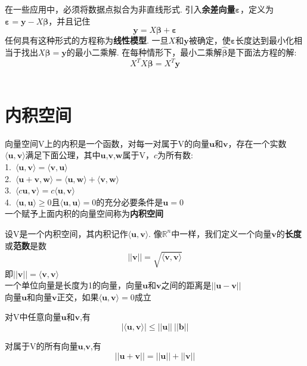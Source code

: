 在一些应用中，必须将数据点拟合为非直线形式. 引入\textbf{余差向量$\bm{\varepsilon}$}，定义为$\bm{\varepsilon}=\bm{y}-X\bm{\beta}$，并且记住
\[\bm{y}=X\bm{\beta}+\bm{\varepsilon}\]
任何具有这种形式的方程称为\textbf{线性模型}. 一旦$X$和$\bm{y}$被确定，使$\bm{\varepsilon}$长度达到最小化相当于找出$X\bm{\beta}=\bm{y}$的最小二乘解. 在每种情形下，最小二乘解$\hat{\bm{\beta}}$是下面法方程的解:
\[X^TX\bm{\beta}=X^T\bm{y}\]\\[2ex]

\section{内积空间}
\begin{definition}
向量空间V上的内积是一个函数，对每一对属于V的向量$\bm{u}$和$\bm{v}$，存在一个实数$\langle\bm{u},\bm{v}\rangle$满足下面公理，其中$\bm{u}$,$\bm{v}$,$\bm{w}$属于V，$c$为所有数:\\
1.\ $\langle\bm{u},\bm{v}\rangle=\langle\bm{v},\bm{u}\rangle$\\
2.\ $\langle\bm{u}+\bm{v},\bm{w}\rangle=\langle\bm{u},\bm{w}\rangle+\langle\bm{v},\bm{w}\rangle$\\
3.\ $\langle c\bm{u},\bm{v}\rangle=c\langle\bm{u},\bm{v}\rangle$\\
4.\ $\langle\bm{u},\bm{u}\rangle\geqslant 0\text{且}\langle\bm{u},\bm{u}\rangle=0\text{的充分必要条件是}\bm{u}=0$\\
一个赋予上面内积的向量空间称为\textbf{内积空间}
\end{definition}\vspace{4ex}

设V是一个内积空间，其内积记作$\langle\bm{u},\bm{v}\rangle$. 像$\mathbb{R}^n$中一样，我们定义一个向量$\bm{v}$的\textbf{长度}或\textbf{范数}是数
\[||\bm{v}||=\sqrt{\langle\bm{v},\bm{v}\rangle}\]
即$||\bm{v}||=\langle\bm{v},\bm{v}\rangle$\\[2ex]

一个单位向量是长度为1的向量，向量$\bm{u}$和$\bm{v}$之间的距离是$||\bm{u}-\bm{v}||$\\[1ex]

向量$\bm{u}$和向量$\bm{v}$正交，如果$\langle\bm{u},\bm{v}\rangle=0$成立\\[2ex]

\begin{TheoremTwo}[柯西-施瓦茨不等式]
对V中任意向量$\bm{u}$和$\bm{v}$,有
\[|\langle\bm{u},\bm{v}\rangle|\leqslant||\bm{u}||\ ||\bm{b}||\]
\end{TheoremTwo}\vspace{4ex}

\begin{TheoremTwo}[三角不等式]
对属于V的所有向量$\bm{u}$,$\bm{v}$,有
\[||\bm{u}+\bm{v}||=||\bm{u}||+||\bm{v}||\]
\end{TheoremTwo}
